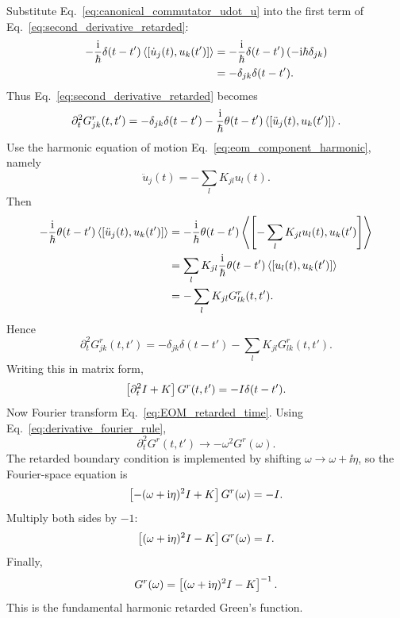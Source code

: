 Substitute Eq.~\eqref{eq:canonical_commutator_udot_u} into the first term of Eq.~\eqref{eq:second_derivative_retarded}:
\begin{align}
    -\frac{\mathrm{i}}{\hbar}\delta(t-t')\left\langle [\dot u_j(t),u_k(t')] \right\rangle
    &= -\frac{\mathrm{i}}{\hbar}\delta(t-t')\left( -\mathrm{i}\hbar\delta_{jk} \right) \\
    &= -\delta_{jk}\delta(t-t').
\end{align}
Thus Eq.~\eqref{eq:second_derivative_retarded} becomes
\begin{equation}
    \partial_t^2 G^r_{jk}(t,t')
    = -\delta_{jk}\delta(t-t') -\frac{\mathrm{i}}{\hbar}\theta(t-t')\left\langle [\ddot u_j(t),u_k(t')] \right\rangle. 
    \label{eq:second_derivative_with_delta}
\end{equation}
Use the harmonic equation of motion Eq.~\eqref{eq:eom_component_harmonic}, namely
\begin{equation}
    \ddot u_j(t) = -\sum_l K_{jl}u_l(t).
\end{equation}
Then
\begin{align}
    -\frac{\mathrm{i}}{\hbar}\theta(t-t')\left\langle [\ddot u_j(t),u_k(t')] \right\rangle
    &= -\frac{\mathrm{i}}{\hbar}\theta(t-t')\left\langle \left[-\sum_l K_{jl}u_l(t),u_k(t')\right] \right\rangle \\
    &= \sum_l K_{jl}\frac{\mathrm{i}}{\hbar}\theta(t-t')\left\langle [u_l(t),u_k(t')] \right\rangle \\
    &= -\sum_l K_{jl}G^r_{lk}(t,t').
\end{align}
Hence
\begin{equation}
    \partial_t^2 G^r_{jk}(t,t') = -\delta_{jk}\delta(t-t') - \sum_l K_{jl} G^r_{lk}(t,t').
\end{equation}
Writing this in matrix form,
\begin{equation}
    \left[ \partial_t^2 I + K \right]G^r(t,t') = -I\delta(t-t').
    \label{eq:EOM_retarded_time}
\end{equation}
Now Fourier transform Eq.~\eqref{eq:EOM_retarded_time}. Using Eq.~\eqref{eq:derivative_fourier_rule},
\begin{equation}
    \partial_t^2 G^r(t,t') \longrightarrow -\omega^2 G^r(\omega).
\end{equation}
The retarded boundary condition is implemented by shifting $\omega \to \omega+\ii\eta$, so the Fourier-space equation is
\begin{equation}
    \left[ -(\omega+\mathrm{i}\eta)^2I + K \right]G^r(\omega) = -I.
\end{equation}
Multiply both sides by $-1$:
\begin{equation}
    \left[ (\omega+\mathrm{i}\eta)^2I - K \right]G^r(\omega) = I.
\end{equation}
Finally,
\begin{equation}
    G^r(\omega) = \left[ (\omega+\mathrm{i}\eta)^2I - K \right]^{-1}.
    \label{eq:retarded_full_harmonic}
\end{equation}
This is the fundamental harmonic retarded Green's function.


